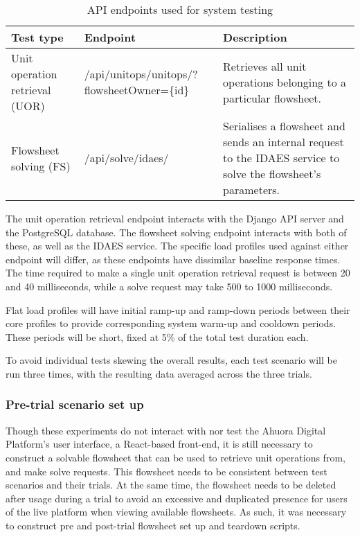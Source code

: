 \begin{table}[h]
    \centering
    \begin{tabularx}{\textwidth}{|p{}|X|p{}|}
        \hline
        \textbf{Test type} & \textbf{Endpoint} & \textbf{Description} \\ \hline
        Unit operation retrieval (UOR) & /api/unitops/unitops/?flowsheetOwner=\{id\} & Retrieves all unit operations belonging to a particular flowsheet. \\ \hline

        Flowsheet solving (FS) & /api/solve/idaes/ & Serialises a flowsheet and sends an internal request to the IDAES service to solve the flowsheet's parameters. \\ \hline
    \end{tabularx}
    \caption{API endpoints used for system testing}
    \label{table:test-api-endpoints}
\end{table}

The unit operation retrieval endpoint interacts with the Django API server and the PostgreSQL database. The flowsheet solving endpoint interacts with both of these, as well as the IDAES service. The specific load profiles used against either endpoint will differ, as these endpoints have dissimilar baseline response times. The time required to make a single unit operation retrieval request is between 20 and 40 milliseconds, while a solve request may take 500 to 1000 milliseconds.


Flat load profiles will have initial ramp-up and ramp-down periods between their core profiles to provide corresponding system warm-up and cooldown periods. These periods will be short, fixed at 5\% of the total test duration each.

To avoid individual tests skewing the overall results, each test scenario will be run three times, with the resulting data averaged across the three trials.

\subsubsection{Pre-trial scenario set up}

Though these experiments do not interact with nor test the Ahuora Digital Platform's user interface, a React-based front-end, it is still necessary to construct a solvable flowsheet that can be used to retrieve unit operations from, and make solve requests. This flowsheet needs to be consistent between test scenarios and their trials. At the same time, the flowsheet needs to be deleted after usage during a trial to avoid an excessive and duplicated presence for users of the live platform when viewing available flowsheets. As such, it was necessary to construct pre and post-trial flowsheet set up and teardown scripts.


